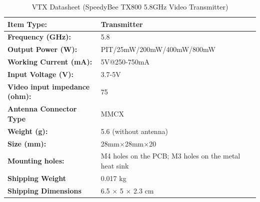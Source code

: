 \documentclass[12pt]{report}
\begin{document}
      \begin{table}
        \centering
        \caption{VTX Datasheet (SpeedyBee TX800 5.8GHz Video Transmitter)}
        \begin{tabular}{|>{\columncolor{cyan!20}}l|l|}
    \hline
    \textbf{Item Type:} & Transmitter \\ 
    \hline
    \textbf{Frequency (GHz):} & 5.8 \\ 
    \hline
    \textbf{Output Power (W):} & PIT/25mW/200mW/400mW/800mW \\ 
    \hline
    \textbf{Working Current (mA):} & 5V@250-750mA \\ 
    \hline
    \textbf{Input Voltage (V):} & 3.7-5V \\ 
    \hline
    \textbf{Video input impedance (ohm):} & 75 \\ 
    \hline
    \textbf{Antenna Connector Type} & MMCX \\ 
    \hline
    \textbf{Weight (g):} & 5.6 (without antenna) \\ 
    \hline
    \textbf{Size (mm):} & 28mm$\times$28mm$\times$20 \\ 
    \hline
    \textbf{Mounting holes:} & M4 holes on the PCB; M3 holes on the metal heat sink \\ 
    \hline
    \textbf{Shipping Weight} & 0.017 kg \\ 
    \hline
    \textbf{Shipping Dimensions} & 6.5 $\times$ 5 $\times$ 2.3 cm \\ 
    \hline
\end{tabular}
      \end{table}
\end{document}
